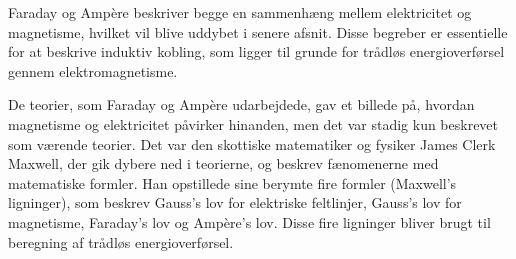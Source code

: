 Faraday og Ampère beskriver begge en sammenhæng mellem elektricitet og magnetisme, hvilket vil blive uddybet i senere afsnit. Disse begreber er essentielle for at beskrive induktiv kobling, som ligger til grunde for trådløs energioverførsel gennem elektromagnetisme.

De teorier, som Faraday og Ampère udarbejdede, gav et billede på, hvordan magnetisme og elektricitet påvirker hinanden, men det var stadig kun beskrevet som værende teorier. Det var den skottiske matematiker og fysiker James Clerk Maxwell, der gik dybere ned i teorierne, og beskrev fænomenerne med matematiske formler. Han opstillede sine berymte fire formler (Maxwell's ligninger), som beskrev Gauss's lov for elektriske feltlinjer, Gauss's lov for magnetisme, Faraday's lov og Ampère's lov. Disse fire ligninger bliver brugt til beregning af trådløs energioverførsel.
\newpage